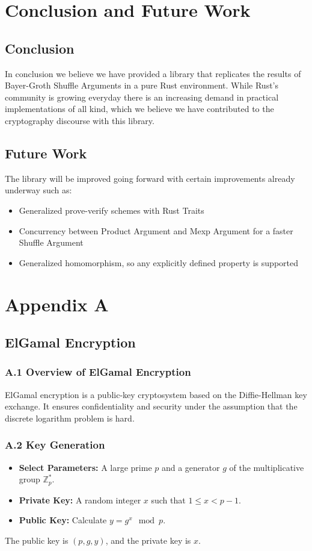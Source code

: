 \documentclass[12pt,a4paper]{report}
\begin{document}
\chapter{Conclusion and Future Work}
\section{Conclusion}
In conclusion we believe we have provided a library that replicates the results of Bayer-Groth Shuffle Arguments in a pure Rust environment. 
While Rust's community is growing everyday there is an increasing demand in practical implementations of all kind, which we believe we have contributed to the cryptography discourse with this library.

\section{Future Work}
The library will be improved going forward with certain improvements already underway such as:
\begin{itemize}
	\item Generalized prove-verify schemes with Rust Traits
	\item Concurrency between Product Argument and Mexp Argument for a faster Shuffle Argument
	\item Generalized homomorphism, so any explicitly defined property is supported
\end{itemize}

\newpage
{}



\appendix
\chapter{Appendix A}
\section{ElGamal Encryption}

\subsection{A.1 Overview of ElGamal Encryption}
ElGamal encryption is a public-key cryptosystem based on the Diffie-Hellman key exchange. It ensures confidentiality and security under the assumption that the discrete logarithm problem is hard.

\subsection{A.2 Key Generation}
\begin{itemize}
    \item \textbf{Select Parameters:} A large prime \( p \) and a generator \( g \) of the multiplicative group \( \mathbb{Z}_p^* \).
    \item \textbf{Private Key:} A random integer \( x \) such that \( 1 \leq x < p-1 \).
    \item \textbf{Public Key:} Calculate \( y = g^x \mod p \).
\end{itemize}
The public key is \( (p, g, y) \), and the private key is \( x \).
\end{document}
